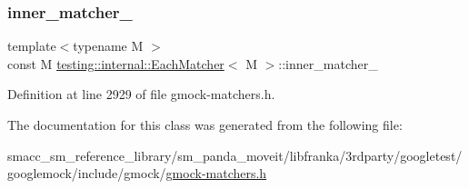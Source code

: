 \subsubsection{\texorpdfstring{inner\+\_\+matcher\+\_\+}{inner\_matcher\_}}
{\footnotesize\ttfamily template$<$typename M $>$ \\
const M \hyperlink{classtesting_1_1internal_1_1EachMatcher}{testing\+::internal\+::\+Each\+Matcher}$<$ M $>$\+::inner\+\_\+matcher\+\_\+\hspace{0.3cm}{\ttfamily [private]}}



Definition at line 2929 of file gmock-\/matchers.\+h.



The documentation for this class was generated from the following file\+:\begin{DoxyCompactItemize}
\item 
smacc\+\_\+sm\+\_\+reference\+\_\+library/sm\+\_\+panda\+\_\+moveit/libfranka/3rdparty/googletest/googlemock/include/gmock/\hyperlink{gmock-matchers_8h}{gmock-\/matchers.\+h}\end{DoxyCompactItemize}
